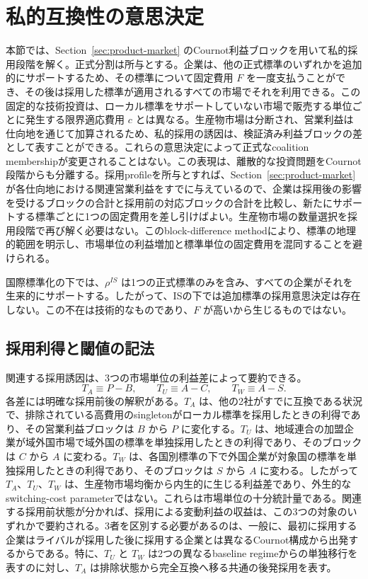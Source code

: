 \section{私的互換性の意思決定}
\label{sec:private-compatibility}

本節では、Section~\ref{sec:product-market} のCournot利益ブロックを用いて私的採用段階を解く。正式分割は所与とする。企業は、他の正式標準のいずれかを追加的にサポートするため、その標準について固定費用 $F$ を一度支払うことができ、その後は採用した標準が適用されるすべての市場でそれを利用できる。この固定的な技術投資は、ローカル標準をサポートしていない市場で販売する単位ごとに発生する限界適応費用 $c$ とは異なる。生産物市場は分断され、営業利益は仕向地を通じて加算されるため、私的採用の誘因は、検証済み利益ブロックの差として表すことができる。これらの意思決定によって正式なcoalition membershipが変更されることはない。この表現は、離散的な投資問題をCournot段階からも分離する。採用profileを所与とすれば、Section~\ref{sec:product-market} が各仕向地における関連営業利益をすでに与えているので、企業は採用後の影響を受けるブロックの合計と採用前の対応ブロックの合計を比較し、新たにサポートする標準ごとに1つの固定費用を差し引けばよい。生産物市場の数量選択を採用段階で再び解く必要はない。このblock-difference methodにより、標準の地理的範囲を明示し、市場単位の利益増加と標準単位の固定費用を混同することを避けられる。

国際標準化の下では、$\rho^{IS}$ は1つの正式標準のみを含み、すべての企業がそれを生来的にサポートする。したがって、ISの下では追加標準の採用意思決定は存在しない。この不在は技術的なものであり、$F$ が高いから生じるものではない。

\subsection{採用利得と閾値の記法}
\label{subsec:private-thresholds}

関連する採用誘因は、3つの市場単位の利益差によって要約できる。
\begin{equation}
    T_A\equiv P-B,
    \qquad
    T_U\equiv A-C,
    \qquad
    T_W\equiv A-S.
    \label{eq:private-threshold-definitions}
\end{equation}
各差には明確な採用前後の解釈がある。$T_A$ は、他の2社がすでに互換である状況で、排除されている高費用のsingletonがローカル標準を採用したときの利得であり、その営業利益ブロックは $B$ から $P$ に変化する。$T_U$ は、地域連合の加盟企業が域外国市場で域外国の標準を単独採用したときの利得であり、そのブロックは $C$ から $A$ に変わる。$T_W$ は、各国別標準の下で外国企業が対象国の標準を単独採用したときの利得であり、そのブロックは $S$ から $A$ に変わる。したがって $T_A$、$T_U$、$T_W$ は、生産物市場均衡から内生的に生じる利益差であり、外生的なswitching-cost parameterではない。これらは市場単位の十分統計量である。関連する採用前状態が分かれば、採用による変動利益の収益は、この3つの対象のいずれかで要約される。3者を区別する必要があるのは、一般に、最初に採用する企業はライバルが採用した後に採用する企業とは異なるCournot構成から出発するからである。特に、$T_U$ と $T_W$ は2つの異なるbaseline regimeからの単独移行を表すのに対し、$T_A$ は排除状態から完全互換へ移る共通の後発採用を表す。

